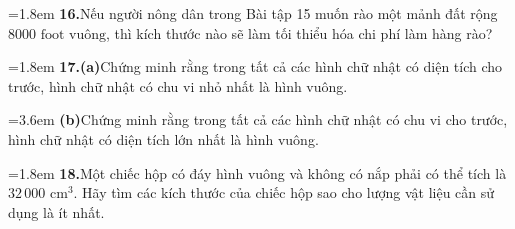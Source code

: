\documentclass[10pt]{article}
\newcommand{\exercise}[2]{%
  \noindent\hangindent=1.8em\hangafter=1
  \textbf{#1.}\hspace{0.55em}#2\par\vspace{0.65em}%
}
\begin{document}
\begin{minipage}[t]{0.485\textwidth}
\exercise{16}{Nếu người nông dân trong Bài tập 15 muốn rào một mảnh đất rộng $8000\text{ foot vuông}$, thì kích thước nào sẽ làm tối thiểu hóa chi phí làm hàng rào?}

\noindent\hangindent=1.8em
\textbf{17.}\hspace{0.55em}\textbf{(a)}\hspace{0.4em}Chứng minh rằng trong tất cả các hình chữ nhật có diện tích cho trước, hình chữ nhật có chu vi nhỏ nhất là hình vuông.\par\vspace{0.25em}
\noindent\hspace*{1.8em}\hangindent=3.6em
\textbf{(b)}\hspace{0.4em}Chứng minh rằng trong tất cả các hình chữ nhật có chu vi cho trước, hình chữ nhật có diện tích lớn nhất là hình vuông.\par\vspace{0.65em}

\exercise{18}{Một chiếc hộp có đáy hình vuông và không có nắp phải có thể tích là $32\,000\text{ cm}^3$. Hãy tìm các kích thước của chiếc hộp sao cho lượng vật liệu cần sử dụng là ít nhất.}

\end{minipage}%
\hfill
\end{document}
